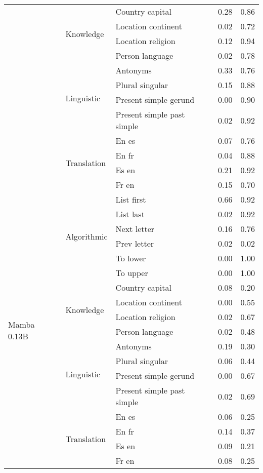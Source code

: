 \begin{center}
\begin{longtable}{lllrr}
 & \multirow[t]{4}{*}{Knowledge} & Country capital & 0.28 & 0.86 \\
 &  & Location continent & 0.02 & 0.72 \\
 &  & Location religion & 0.12 & 0.94 \\
 &  & Person language & 0.02 & 0.78 \\
\cline{2-5}
 & \multirow[t]{4}{*}{Linguistic} & Antonyms & 0.33 & 0.76 \\
 &  & Plural singular & 0.15 & 0.88 \\
 &  & Present simple gerund & 0.00 & 0.90 \\
 &  & Present simple past simple & 0.02 & 0.92 \\
\cline{2-5}
 & \multirow[t]{4}{*}{Translation} & En es & 0.07 & 0.76 \\
 &  & En fr & 0.04 & 0.88 \\
 &  & Es en & 0.21 & 0.92 \\
 &  & Fr en & 0.15 & 0.70 \\
\cline{1-5} \cline{2-5}
\multirow[t]{18}{*}{Mamba 0.13B} & \multirow[t]{6}{*}{Algorithmic} & List first & 0.66 & 0.92 \\
 &  & List last & 0.02 & 0.92 \\
 &  & Next letter & 0.16 & 0.76 \\
 &  & Prev letter & 0.02 & 0.02 \\
 &  & To lower & 0.00 & 1.00 \\
 &  & To upper & 0.00 & 1.00 \\
\cline{2-5}
 & \multirow[t]{4}{*}{Knowledge} & Country capital & 0.08 & 0.20 \\
 &  & Location continent & 0.00 & 0.55 \\
 &  & Location religion & 0.02 & 0.67 \\
 &  & Person language & 0.02 & 0.48 \\
\cline{2-5}
 & \multirow[t]{4}{*}{Linguistic} & Antonyms & 0.19 & 0.30 \\
 &  & Plural singular & 0.06 & 0.44 \\
 &  & Present simple gerund & 0.00 & 0.67 \\
 &  & Present simple past simple & 0.02 & 0.69 \\
\cline{2-5}
 & \multirow[t]{4}{*}{Translation} & En es & 0.06 & 0.25 \\
 &  & En fr & 0.14 & 0.37 \\
 &  & Es en & 0.09 & 0.21 \\
 &  & Fr en & 0.08 & 0.25 \\

\end{longtable}
\end{center}
